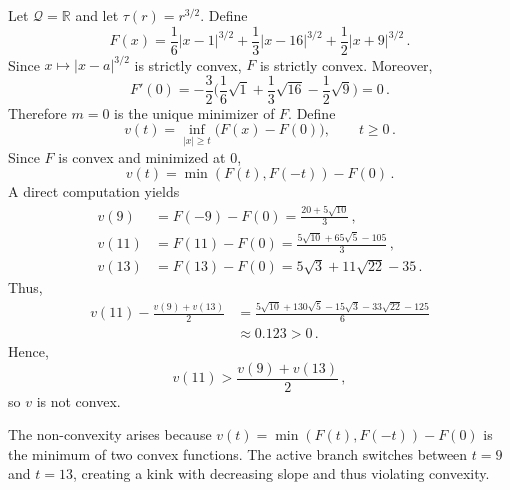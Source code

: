 \documentclass{article}
\newcommand*{\mc}[1]{\mathcal{#1}}
\newcommand{\R}{\mathbb{R}}
\newcommand{\eqcm}{\,,} %
\newcommand{\eqfs}{\,.}
\newcommand{\tran}{\tau}
\begin{document}
\begin{example}\label{exa:v:notconvex}
    Let $\mc Q=\R$ and let $\tran(r)=r^{3/2}$. Define
    \begin{equation}
        F(x)
        =
        \frac16 |x-1|^{3/2}
        +
        \frac13 |x-16|^{3/2}
        +
        \frac12 |x+9|^{3/2}
        \eqfs
    \end{equation}
    Since $x\mapsto |x-a|^{3/2}$ is strictly convex, $F$ is strictly
    convex. Moreover,
    \begin{equation}
        F'(0)
        =
        -\frac32
        \biggl(
        \frac16\sqrt1
        +
        \frac13\sqrt{16}
        -
        \frac12\sqrt9
        \biggr)
        =
        0
        \eqfs
    \end{equation}
    Therefore $m=0$ is the unique minimizer of $F$.
    Define
    \begin{equation}
        v(t)
        =
        \inf_{|x|\ge t}
        \bigl(F(x)-F(0)\bigr),
        \qquad t\ge0
        \eqfs
    \end{equation}
    Since $F$ is convex and minimized at $0$,
    \begin{equation}
        v(t)
        =
        \min(F(t),F(-t))-F(0)
        \eqfs
    \end{equation}
    A direct computation yields
    \begin{align}
        v(9)&=F(-9)-F(0)
        =
        \frac{20+5\sqrt{10}}{3}
        \eqcm
        \\
        v(11)&=F(11)-F(0)
        =
        \frac{5\sqrt{10}+65\sqrt5-105}{3}
        \eqcm
        \\
        v(13)&=F(13)-F(0)
        =
        5\sqrt3+11\sqrt{22}-35
        \eqfs
    \end{align}
    Thus,
    \begin{align}
        v(11)-\frac{v(9)+v(13)}2
        &=
        \frac{
            5\sqrt{10}
            +130\sqrt5
            -15\sqrt3
            -33\sqrt{22}
            -125
        }{6}
        \\
        &\approx 0.123
        >
        0
        \eqfs
    \end{align}
    Hence,
    \begin{equation}
        v(11)
        >
        \frac{v(9)+v(13)}2
        \eqcm
    \end{equation}
    so $v$ is not convex.
    
    The non-convexity arises because $v(t)=\min(F(t),F(-t))-F(0)$ is the minimum of two convex functions. The active branch switches between $t=9$ and $t=13$, creating a kink with decreasing slope and thus violating convexity.
\end{example}
\end{document}
